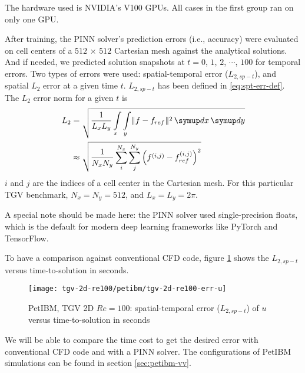 The hardware used is NVIDIA's V100 GPUs.
All cases in the first group ran on only one GPU.

After training, the PINN solver's prediction errors (i.e., accuracy) were evaluated on cell centers of a $512$ $\times$ $512$ Cartesian mesh against the analytical solutions.
And if needed, we predicted solution snapshots at $t=0$, $1$, $2$, $\cdots$, $100$ for temporal errors.
Two types of errors were used: spatial-temporal error ($L_{2,sp-t}$), and spatial $L_2$ error at a given time $t$.
$L_{2,sp-t}$ has been defined in \eqref{eq:spt-err-def}.
The $L_2$ error norm for a given $t$ is
\begin{equation}\label{eq:l2norm}
    \begin{aligned}
        L_2
        &=
        \sqrt{
            \frac{1}{L_x L_y}
            \int\limits_{x}\int\limits_{y} \lVert f - f_{ref}\rVert^2
            \diff x \diff y
        } \\
        &\approx
        \sqrt{
            \frac{1}{N_x N_y}
            \sum\limits_{i}^{N_x}\sum\limits_{j}^{N_y}
            \left(f^{\left(i, j\right)}-f_{ref}^{\left(i, j\right)}\right)^2
        }
    \end{aligned}
\end{equation}
$i$ and $j$ are the indices of a cell center in the Cartesian mesh.
For this particular TGV benchmark, $N_x=N_y=512$, and $L_x=L_y=2\pi$.

A special note should be made here: the PINN solver used single-precision floats, which is the default for modern deep learning frameworks like PyTorch and TensorFlow.

To have a comparison against conventional CFD code, figure \ref{fig:petibm-tgv-spatial-temporal-error} shows the $L_{2,sp-t}$ versus time-to-solution in seconds.
\begin{figure}[hbt!]
    \centering%
    \texttt{[image: tgv-2d-re100/petibm/tgv-2d-re100-err-u]}%
    \caption[%
        PetIBM, TGV 2D $Re=100$: spatial-temporal error ($L_{2,sp-t}$) of $u$%
    ]{%
        PetIBM, TGV 2D $Re=100$: spatial-temporal error ($L_{2,sp-t}$)  of $u$ versus time-to-solution in seconds%
    }\label{fig:petibm-tgv-spatial-temporal-error}%
\end{figure}
We will be able to compare the time cost to get the desired error with conventional CFD code and with a PINN solver.
The configurations of PetIBM simulations can be found in section \ref{sec:petibm-vv}.
